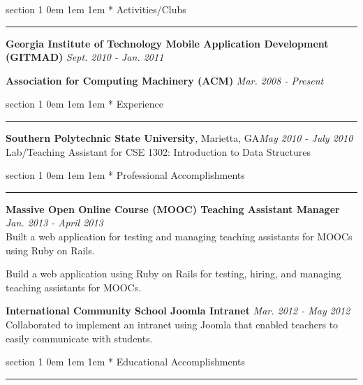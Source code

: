\documentclass{article}
\makeatletter
\renewcommand{\section}[1]{
	\vspace{0.75em} %
	\@startsection
		{section}
		{1}
		{\z@}
		{0em}
		{1em \@minus 1em} %
		{\normalfont\large\sc\bfseries}
		*
		{#1}
	\vspace{-0.75em} %
	\hrule
	\vspace{0.25em} %
	\par
}
\newcommand{\entry}[1]{\def \@entry {#1}}
\newcommand{\dates}[1]{\def \@dates {#1}}
\newenvironment{datedentry}{
		\vspace{0.5em} %
		{\bf \@entry} \hfill {\it \@dates} \\
	}{}
\newcommand{\location}[1]{\def \@location {#1}}
\newenvironment{locationentry}{
		\vspace{0.5em} %
		{\bf \@entry}, \@location \hfill {\it \@dates} \\
	}{}
\makeatother
\begin{document}
%
%
\section{Activities/Clubs}
\entry{Georgia Institute of Technology Mobile Application Development (GITMAD)}
\dates{Sept. 2010 - Jan. 2011}
\begin{datedentry}
\end{datedentry}

\entry{Association for Computing Machinery (ACM)}
\dates{Mar. 2008 - Present}
\begin{datedentry}
\end{datedentry}

%
%
\section{Experience}
\entry{Southern Polytechnic State University}
\location{Marietta, GA}
\dates{May 2010 - July 2010}
\begin{locationentry}
 Lab/Teaching Assistant for CSE 1302: Introduction to Data Structures
\end{locationentry}

%
%
\section{Professional Accomplishments}

\entry{Massive Open Online Course (MOOC) Teaching Assistant Manager}
\dates{Jan. 2013 - April 2013}
\begin{datedentry}
Built a web application for testing and managing teaching assistants for MOOCs
using Ruby on Rails.

Build a web application using Ruby on Rails for testing, hiring, and managing
teaching assistants for MOOCs.
\end{datedentry}

\entry{International Community School Joomla Intranet}
\dates{Mar. 2012 - May 2012}
\begin{datedentry}
Collaborated to implement an intranet using Joomla that enabled teachers to
easily communicate with students.
\end{datedentry}

%
%
\section{Educational Accomplishments}
\end{document}

